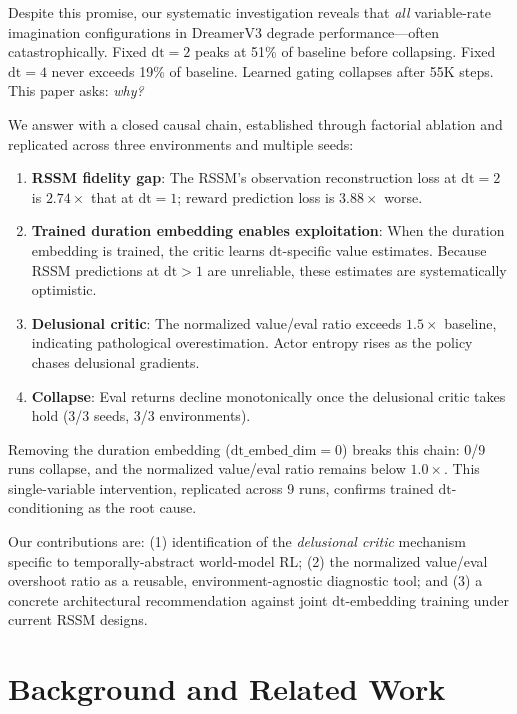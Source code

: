 \documentclass[10pt,letterpaper]{article}
\begin{document}
Despite this promise, our systematic investigation reveals that \emph{all} variable-rate imagination configurations in DreamerV3 degrade performance---often catastrophically. Fixed $\mathrm{dt}{=}2$ peaks at 51\% of baseline before collapsing. Fixed $\mathrm{dt}{=}4$ never exceeds 19\% of baseline. Learned gating collapses after 55K steps. This paper asks: \emph{why?}

We answer with a closed causal chain, established through factorial ablation and replicated across three environments and multiple seeds:

\begin{enumerate}
    \item \textbf{RSSM fidelity gap}: The RSSM's observation reconstruction loss at $\mathrm{dt}{=}2$ is $2.74\times$ that at $\mathrm{dt}{=}1$; reward prediction loss is $3.88\times$ worse.
    \item \textbf{Trained duration embedding enables exploitation}: When the duration embedding is trained, the critic learns $\mathrm{dt}$-specific value estimates. Because RSSM predictions at $\mathrm{dt}{>}1$ are unreliable, these estimates are systematically optimistic.
    \item \textbf{Delusional critic}: The normalized value/eval ratio exceeds $1.5\times$ baseline, indicating pathological overestimation. Actor entropy rises as the policy chases delusional gradients.
    \item \textbf{Collapse}: Eval returns decline monotonically once the delusional critic takes hold (3/3 seeds, 3/3 environments).
\end{enumerate}

Removing the duration embedding ($\mathrm{dt\_embed\_dim}{=}0$) breaks this chain: 0/9 runs collapse, and the normalized value/eval ratio remains below $1.0\times$. This single-variable intervention, replicated across 9 runs, confirms trained $\mathrm{dt}$-conditioning as the root cause.

Our contributions are: (1) identification of the \emph{delusional critic} mechanism specific to temporally-abstract world-model RL; (2) the normalized value/eval overshoot ratio as a reusable, environment-agnostic diagnostic tool; and (3) a concrete architectural recommendation against joint $\mathrm{dt}$-embedding training under current RSSM designs.


\section{Background and Related Work}
\label{sec:background}
\end{document}
